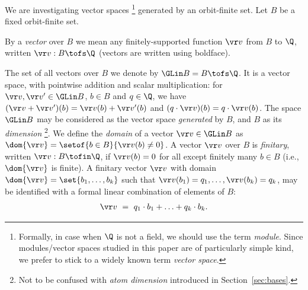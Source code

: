 

We are investigating vector spaces%
\footnote{
Formally, in case when $\Q$ is not a field, we should use the term \emph{module}.
Since modules/vector spaces studied in this paper are of particularly simple kind,
we prefer to stick to a widely known term \emph{vector space}.
} 
generated by an orbit-finite set.
Let $B$ be a fixed orbit-finite set.
\begin{definition}
By a \emph{vector} over $B$ we mean any finitely-supported function $\vr v$ from $B$ to $\Q$, 
written $\vr v : B\tofs\Q$ (vectors are written using boldface).
\end{definition}
The set of all vectors over $B$ we denote by $\GLin B = B \tofs \Q$. 
It is a vector space, 
with pointwise addition and scalar multiplication:
for $\vr v, \vr v'\in\GLin B$, $b\in B$ and $q\in \Q$, we have
$(\vr v+ \vr v')(b) = \vr v(b) + \vr v'(b)$ and $(q \cdot \vr v)(b) = q\cdot \vr v(b)$.
The space $\GLin B$ may be considered as  the vector space \emph{generated} by $B$,
and $B$ as its \emph{dimension}%
\footnote{
Not to be confused with \emph{atom dimension} introduced in Section~\ref{sec:bases}.
}.
%
We define the \emph{domain} of a vector $\vr v\in\GLin B$ as $\dom {\vr v} = \setof{b\in B}{\vr v(b)\neq 0}$.
%
%
A vector $\vr v$ over $B$ is \emph{finitary}, written $\vr v : B\tofin \Q$, 
if $\vr v(b) = 0$ for all except finitely many $b\in B$
(i.e., $\dom {\vr v}$ is finite).
A finitary vector $\vr v$ with domain $\dom {\vr v} = \set{b_1, \ldots, b_k}$ such that
$\vr v(b_1) = q_1, \ldots, \vr v(b_k) = q_k$, 
may be identified with a formal linear combination of elements 
of $B$:
%
\begin{align} \label{eq:formalsum}
\vr v \ = \ q_1 \cdot b_1 + \ldots + q_k \cdot b_k.  %
\end{align}
